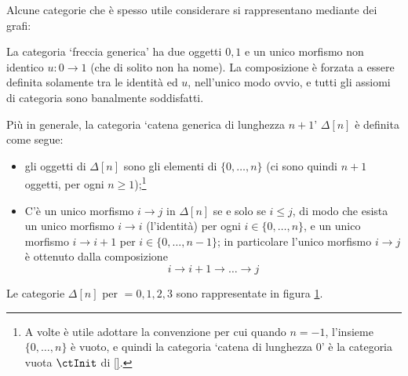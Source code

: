 Alcune categorie che è spesso utile considerare si rappresentano mediante dei grafi:
\begin{example}\label{ex_cat_freccia}
	La categoria `freccia generica' ha due oggetti $0,1$ e un unico morfismo non identico $u : 0\to 1$ (che di solito non ha nome). La composizione è forzata a essere definita solamente tra le identità ed $u$, nell'unico modo ovvio, e tutti gli assiomi di categoria sono banalmente soddisfatti.
\end{example}
\begin{example}\label{ex_cat_catena}
	Più in generale, la categoria `catena generica di lunghezza $n+1$' $\Delta[n]$ è definita come segue:
	\begin{itemize}
		\item gli oggetti di $\Delta[n]$ sono gli elementi di \(\{0,\dots,n\}\) (ci sono quindi $n+1$ oggetti, per ogni $n\ge 1$);\footnote{A volte è utile adottare la convenzione per cui quando $n=-1$, l'insieme $\{0,\dots,n\}$ è vuoto, e quindi la categoria `catena di lunghezza $0$' è la categoria vuota $\ctInit$ di \ref{}.}
		\item C'è un unico morfismo $i\to j$ in $\Delta[n]$ se e solo se $i\le j$, di modo che esista un unico morfismo $i\to i$ (l'identità) per ogni $i\in\{0,\dots,n\}$, e un unico morfismo $i\to i+1$ per $i\in\{0,\dots,n-1\}$; in particolare l'unico morfismo $i\to j$ è ottenuto dalla composizione
		\[i\to i+1\to\dots\to j\]
	\end{itemize}
	Le categorie $\Delta[n]$ per $=0,1,2,3$ sono rappresentate in figura \ref{fig:le_delta}.
	\begin{figure}[h]
		\label{fig:le_delta}
		\begin{center}
\end{center}
\end{figure}
\end{example}
